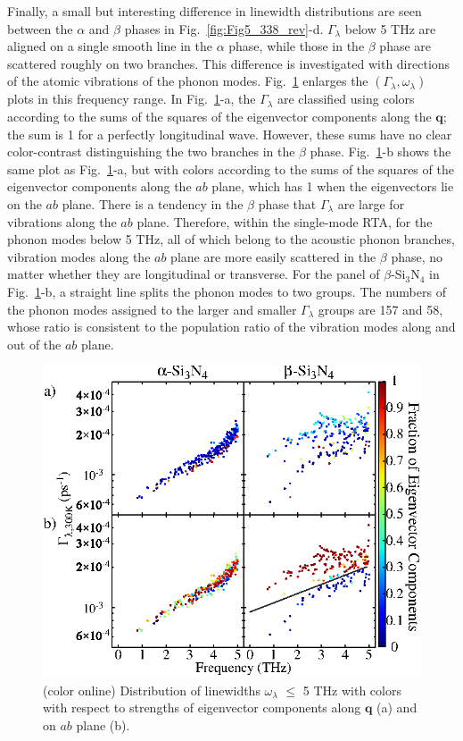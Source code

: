 \documentclass[twocolumn,amsmath,amssymb,a4paper,prb,superscriptaddress,floatfix]{revtex4-1}
\begin{document}
Finally, a small but interesting difference in linewidth distributions are seen
between the $\alpha$ and $\beta$ phases in Fig.~\ref{fig:Fig5_338_rev}-d.
$\Gamma_\lambda$ below 5 THz are aligned on a single smooth line in the $\alpha$
phase, while those in the $\beta$ phase are scattered roughly on two branches.
This difference is investigated with directions of the atomic vibrations of the
phonon modes. Fig.~\ref{fig:Fig7_338} enlarges the
$(\Gamma_\lambda,\omega_\lambda)$ plots in this frequency range. In
Fig.~\ref{fig:Fig7_338}-a, the $\Gamma_\lambda$ are classified using colors
according to the sums of the squares of the eigenvector components along the
$\mathbf{q}$; the sum is 1 for a perfectly longitudinal wave. However, these
sums have no clear color-contrast distinguishing the two branches in the $\beta$
phase.  Fig.~\ref{fig:Fig7_338}-b shows the same plot as
Fig.~\ref{fig:Fig7_338}-a, but with colors according to the sums of the squares
of the eigenvector components along the $ab$ plane, which has 1 when the
eigenvectors lie on the $ab$ plane. There is a tendency in the $\beta$ phase
that  $\Gamma_\lambda$ are large for vibrations along the $ab$ plane.
Therefore, within the single-mode RTA, for the phonon modes below 5 THz, all of
which belong to the acoustic phonon branches, vibration modes along the $ab$
plane are more easily scattered in the $\beta$ phase, no matter whether they are
longitudinal or transverse. For the panel of $\beta$-Si$_3$N$_4$ in
Fig.~\ref{fig:Fig7_338}-b, a straight line splits the phonon modes to two
groups. The numbers of the phonon modes assigned to the larger and smaller
$\Gamma_\lambda$ groups are 157 and 58, whose ratio is consistent to the
population ratio of the vibration modes along and out of the $ab$ plane.

\begin{figure}[ht]
 \centering
  \includegraphics[width=\linewidth]{figure_analyze_gamma3_m1010_print.eps} \caption{(color
	  online) Distribution of linewidths $\omega_\lambda$ $\leq$ 5 THz
		  with colors with respect to strengths of eigenvector components along $\mathbf q$ (a)
		  and on $ab$ plane (b).} \label{fig:Fig7_338} 
 \centering
\end{figure}
\end{document}
